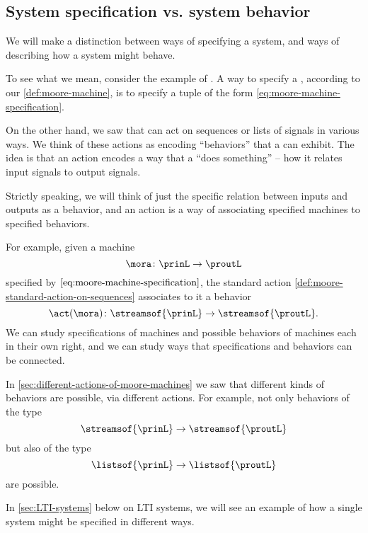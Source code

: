 
\subsection{System specification vs. system behavior}

We will make a distinction between ways of specifying a system, and ways of describing how a system might behave.

To see what we mean, consider the example of .
A way to specify a , according to our \cref{def:moore-machine}, is to specify a tuple of the form \cref{eq:moore-machine-specification}.

On the other hand, we saw that  can act on sequences or lists of signals in various ways.
We think of these actions as encoding ``behaviors'' that a  can exhibit.
The idea is that an action encodes a way that a  ``does something'' -- how it relates input signals to output signals.

Strictly speaking, we will think of just the specific relation between inputs and outputs as a behavior, and an action is a way of associating specified machines to specified behaviors.


For example, given a machine
\begin{equation}
    \mora \colon \prinL \to \proutL
\end{equation}
specified by $\cref{eq:moore-machine-specification}$, the standard action \cref{def:moore-standard-action-on-sequences} associates to it a behavior
\begin{equation}
    \act(\mora) \colon \streamsof{\prinL} \to \streamsof{\proutL}.
\end{equation}
We can study specifications of machines and possible behaviors of machines each in their own right, and we can study ways that specifications and behaviors can be connected.

In \cref{sec:different-actions-of-moore-machines} we saw that different kinds of behaviors are possible, via different actions.
For example, not only behaviors of the type
\begin{equation}
    \streamsof{\prinL}  \to \streamsof{\proutL}
\end{equation}
but also of the type
\begin{equation}
    \listsof{\prinL} \to \listsof{\proutL}
\end{equation}
are possible.

In \cref{sec:LTI-systems} below on LTI systems, we will see an example of how a single system might be specified in different ways.

